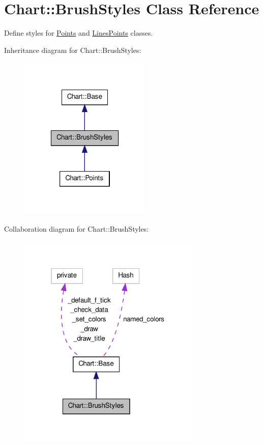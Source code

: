 \hypertarget{classChart_1_1BrushStyles}{
\section{Chart::BrushStyles Class Reference}
\label{classChart_1_1BrushStyles}
}


Define styles for \hyperlink{classChart_1_1Points}{Points} and \hyperlink{classChart_1_1LinesPoints}{LinesPoints} classes.  




Inheritance diagram for Chart::BrushStyles:\nopagebreak
\begin{figure}[H]
\begin{center}
\leavevmode
\includegraphics[width=178pt]{classChart_1_1BrushStyles__inherit__graph}
\end{center}
\end{figure}


Collaboration diagram for Chart::BrushStyles:\nopagebreak
\begin{figure}[H]
\begin{center}
\leavevmode
\includegraphics[width=247pt]{classChart_1_1BrushStyles__coll__graph}
\end{center}
\end{figure}
